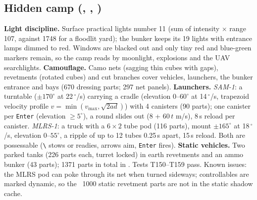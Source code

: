 \subsection{Hidden camp (, , )}
\textbf{Light discipline.} Surface practical lights number 11 (sum of intensity $\times$ range 107, against 1748 for a floodlit yard); the bunker keeps its 19 lights with entrance lamps dimmed to red. Windows are blacked out and only tiny red and blue-green markers remain, so the camp reads by moonlight, explosions and the UAV searchlights.
\textbf{Camouflage.} Camo nets (sagging thin cubes with gaps), revetments (rotated cubes) and cut branches cover vehicles, launchers, the bunker entrance and bays (670 dressing parts; 297 net panels).
\textbf{Launchers.} \emph{SAM-1}: a turntable ($\pm170^\circ$ at 22\,$^\circ$/s) carrying a cradle (elevation $0$--$60^\circ$ at 14\,$^\circ$/s, trapezoid velocity profile $v=\min(v_\text{max},\sqrt{2ad})$) with 4 canisters (90 parts); one canister per \texttt{Enter}
(elevation $\ge5^\circ$), a round slides out (8 + 60\,$t$ m/s), 8\,s reload per canister. \emph{MLRS-1}: a truck with a $6\times2$ tube pod (116 parts), mount $\pm165^\circ$ at 18\,$^\circ$/s, elevation $0$--$55^\circ$, a ripple of up to 12 tubes 0.25\,s apart, 15\,s
reload. Both are possessable (\texttt{\textbackslash} stows or readies, arrows aim, \texttt{Enter} fires). \textbf{Static vehicles.} Two parked tanks (226 parts each, turret locked) in earth revetments and an ammo bunker (43 parts); 1371 parts in total in . Tests T150--T159 pass.
Known issues: the MLRS pod can poke through its net when turned sideways; controllables are marked dynamic, so the ~1000 static revetment parts are not in the static shadow cache.

